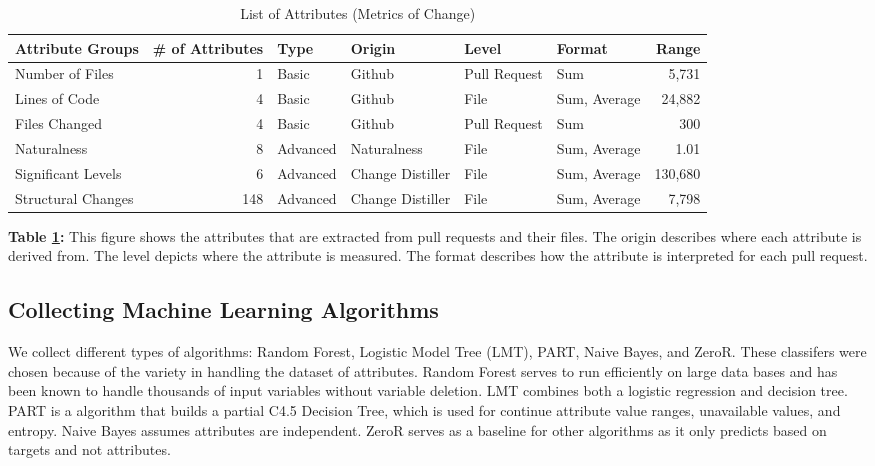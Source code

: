\documentclass[10pt, conference]{IEEEtran}
\begin{document}
\begin{table}[t]
  \centering
  \caption{List of Attributes (Metrics of Change)}
  \label{figureListOfMetrics}
  \begin{tabular}{l|rllllr}
    \toprule
    \textbf{Attribute Groups} & \textbf{\# of Attributes} & \textbf{Type}& \textbf{Origin} & \textbf{Level} & \textbf{Format} & \textbf{Range}\\ %
    \midrule
    Number of Files & 1 & Basic & Github & Pull Request & Sum & 5,731 \\ %
    Lines of Code & 4 & Basic & Github & File & Sum, Average & 24,882 \\ %
    Files Changed & 4 & Basic & Github & Pull Request & Sum & 300 \\ %
    Naturalness & 8 & Advanced & Naturalness & File & Sum, Average & 1.01\\ %
    Significant Levels & 6 & Advanced & Change Distiller & File & Sum, Average &130,680 \\ %
     Structural Changes & 148 & Advanced & Change Distiller & File & Sum, Average & 7,798 \\ %
    \bottomrule
  \end{tabular}
  \break
  \newline
\textbf{Table \ref{figureListOfMetrics}:} This figure shows the attributes that are extracted from pull requests and their files. The origin describes where each attribute is derived from. The level depicts where the attribute is measured. The format describes how the attribute is interpreted for each pull request.
\end{table}

\subsection{Collecting Machine Learning Algorithms}
We collect different types of algorithms: Random Forest, Logistic Model Tree (LMT), PART, Naive Bayes, and ZeroR. These classifers were chosen because of the variety in handling the dataset of attributes. Random Forest serves to run efficiently on large data bases and has been known to handle thousands of input variables without variable deletion. LMT combines both a logistic regression and decision tree. PART is a algorithm that builds a partial C4.5 Decision Tree, which is used for continue attribute value ranges, unavailable values, and entropy. Naive Bayes assumes attributes are independent. ZeroR serves as a baseline for other algorithms as it only predicts based on targets and not attributes.
\end{document}
